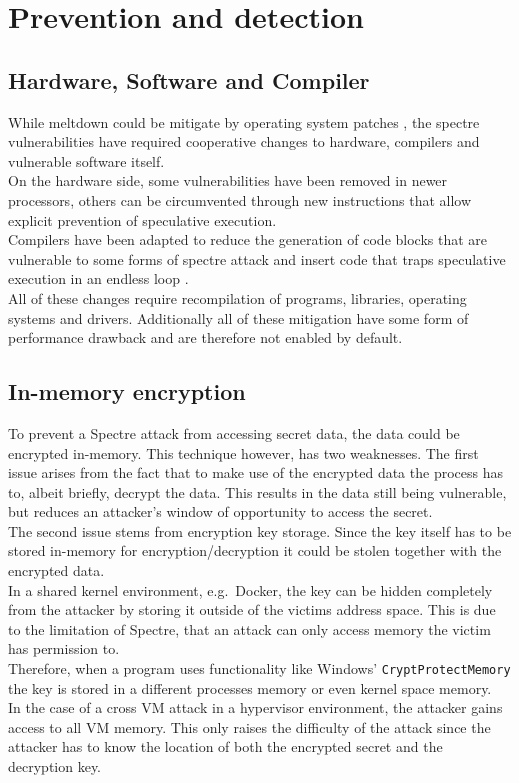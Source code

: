 \documentclass[conference,compsoc,final,a4paper]{IEEEtran}
\begin{document}
\section{Prevention and detection}
\subsection{Hardware, Software and Compiler}
While meltdown could be mitigate by operating system patches \cite{linuxKAISER}, the spectre vulnerabilities have required cooperative changes to hardware, compilers and vulnerable software itself. \\
On the hardware side, some vulnerabilities have been removed in newer processors, others can be circumvented through new instructions that allow explicit prevention of speculative execution. \cite{intelMitigation} \\
Compilers have been adapted to reduce the generation of code blocks that are vulnerable to some forms of spectre attack \cite{msvcQSpectre} and insert code that traps speculative execution in an endless loop \cite{retpolineTurner}. \\
All of these changes require recompilation of programs, libraries, operating systems and drivers. Additionally all of these mitigation have some form of performance drawback and are therefore not enabled by default.
\subsection{In-memory encryption}
To prevent a Spectre attack from accessing secret data, the data could be encrypted in-memory. This technique however, has two weaknesses. The first issue arises from the
fact that to make use of the encrypted data the process has to, albeit briefly, decrypt the data. This results in the data still being vulnerable, but reduces an attacker's
window of opportunity to access the secret. \\
The second issue stems from encryption key storage. Since the key itself has to be stored in-memory for encryption/decryption it could be stolen together with the
encrypted data. \\
In a shared kernel environment, e.g.\  Docker, the key can be hidden completely from the attacker by storing it outside of the victims address space. This is due to
the limitation of Spectre, that an attack can only access memory the victim has permission to. \cite{kocher2018spectre} \\
Therefore, when a program uses functionality like Windows' \lstinline|CryptProtectMemory| \cite{winCryptMem} the key is stored in a different processes memory or even
kernel space memory. \\
In the case of a cross VM attack in a hypervisor environment, the attacker gains access to all VM memory. This only raises the difficulty of the attack since the attacker
has to know the location of both the encrypted secret and the decryption key.
\end{document}
